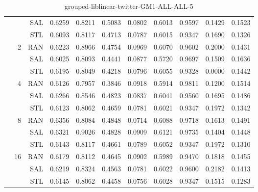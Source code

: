 \begin{center}
\begin{table}[htbp]
\begin{center}
\begin{tabular}{ | r | r | r | r | r | r | r | r | r | r | r |}
 &   & SAL & 0.6259 & 0.8211 & 0.5083 & 0.0802 & 0.6013 & 0.9597 & 0.1429 & 0.1523\\ \cline{3-11}
 &   & STL & 0.6093 & 0.8117 & 0.4713 & 0.0787 & 0.6015 & 0.9347 & 0.1690 & 0.1326\\ \cline{2-11}
 & \multirow{3}{*}{2} & RAN & 0.6223 & 0.8966 & 0.4754 & 0.0969 & 0.6070 & 0.9602 & 0.2000 & 0.1431\\ \cline{3-11}
 &   & SAL & 0.6025 & 0.8093 & 0.4441 & 0.0877 & 0.5720 & 0.9697 & 0.1509 & 0.1636\\ \cline{3-11}
 &   & STL & 0.6195 & 0.8049 & 0.4218 & 0.0796 & 0.6055 & 0.9328 & 0.0000 & 0.1442\\ \cline{2-11}
 & \multirow{3}{*}{4} & RAN & 0.6126 & 0.7957 & 0.3846 & 0.0918 & 0.5914 & 0.9811 & 0.1200 & 0.1514\\ \cline{3-11}
 &   & SAL & 0.6266 & 0.8546 & 0.4823 & 0.0837 & 0.6041 & 0.9560 & 0.1695 & 0.1486\\ \cline{3-11}
 &   & STL & 0.6123 & 0.8062 & 0.4659 & 0.0781 & 0.6021 & 0.9347 & 0.1972 & 0.1342\\ \cline{2-11}
 & \multirow{3}{*}{8} & RAN & 0.6356 & 0.8084 & 0.4848 & 0.0714 & 0.6088 & 0.9718 & 0.1613 & 0.1491\\ \cline{3-11}
 &   & SAL & 0.6321 & 0.9026 & 0.4828 & 0.0909 & 0.6121 & 0.9735 & 0.1404 & 0.1448\\ \cline{3-11}
 &   & STL & 0.6143 & 0.8117 & 0.4661 & 0.0789 & 0.6052 & 0.9347 & 0.1972 & 0.1310\\ \cline{2-11}
 & \multirow{3}{*}{16} & RAN & 0.6179 & 0.8112 & 0.4645 & 0.0902 & 0.5989 & 0.9470 & 0.1818 & 0.1455\\ \cline{3-11}
 &   & SAL & 0.6219 & 0.8324 & 0.4563 & 0.0781 & 0.6022 & 0.9600 & 0.2182 & 0.1413\\ \cline{3-11}
 &   & STL & 0.6145 & 0.8062 & 0.4458 & 0.0756 & 0.6028 & 0.9347 & 0.1515 & 0.1283\\ \cline{2-11}
\hline
\end{tabular}
\caption{grouped-liblinear-twitter-GM1-ALL-ALL-5}
\end{center}
 \end{table}
\end{center}

